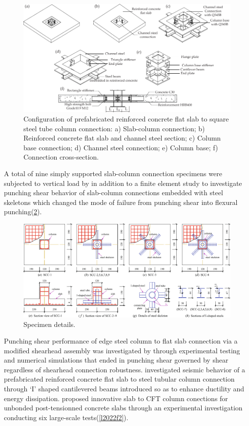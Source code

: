 \begin{figure}\centering
    \includegraphics[width=\textwidth]{Figures/z2018f1.pdf}
    \caption{Configuration of prefabricated reinforced concrete flat slab to square steel tube column connection\citep{zhang2018}: a) Slab-column connection; b) Reinforced concrete flat slab and channel steel section; c) Column base connection; d) Channel steel connection; e) Column base; f) Connection cross-section.}
    \label{z2018f1}
    \end{figure}
A total of nine simply supported slab-column connection specimens were subjected to vertical load by \cite{zhou2021} in addition to a finite element study to investigate punching shear behavior of slab-column connections embedded with steel skeletons which changed the mode of failure from punching shear into flexural punching(\ref{z2021f3}).
\begin{figure}\centering
    \includegraphics[width=\textwidth]{Figures/z2021f3.pdf}
    \caption{Specimen details\citep{zhou2021}.}
    \label{z2021f3}
    \end{figure}
Punching shear performance of edge steel column to flat slab connection via a modified shearhead assembly was investigated by \cite{ngekpe2019} through experimental testing and numerical simulations that ended in punching shear governed by shear regardless of shearhead connection robustness. \cite{zhang2022} investigated seismic behavior of a prefabricated reinforced concrete flat slab to steel tubular column connection through `I' shaped cantilevered beams introduced so as to enhance ductility and energy dissipation. \cite{luu2022} proposed innovative slab to CFT column conections for unbonded post-tensionned concrete slabs through an experimental investigation conducting six large-scale tests(\ref{l2022f2}).
